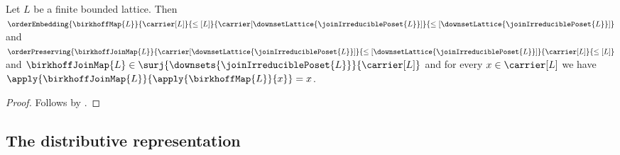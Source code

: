 \begin{theorem}\label{finite_birkhoff_order_retract}
    Let $L$ be a finite bounded lattice.
    Then
        $\orderEmbedding
            {\birkhoffMap{L}}
            {\carrier[L]}{\leq[L]}
            {\carrier[\downsetLattice{\joinIrreduciblePoset{L}}]}
            {\leq[\downsetLattice{\joinIrreduciblePoset{L}}]}$ and
        $\orderPreserving
            {\birkhoffJoinMap{L}}
            {\carrier[\downsetLattice{\joinIrreduciblePoset{L}}]}
            {\leq[\downsetLattice{\joinIrreduciblePoset{L}}]}
            {\carrier[L]}{\leq[L]}$ and
        $\birkhoffJoinMap{L}\in
            \surj{\downsets{\joinIrreduciblePoset{L}}}{\carrier[L]}$ and
        for every $x\in\carrier[L]$ we have
            $\apply{\birkhoffJoinMap{L}}
                {\apply{\birkhoffMap{L}}{x}}=x$.
\end{theorem}
\begin{proof}
    Follows by
        .
\end{proof}

\subsection{The distributive representation}

